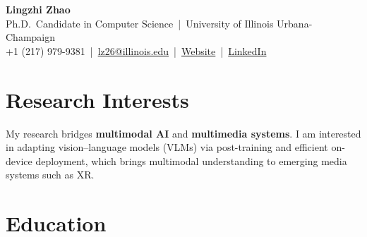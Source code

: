 \documentclass[10pt, letterpaper]{article}
\begin{document}

\begin{center}
  {\Huge\bfseries\color{navy} Lingzhi Zhao}\\[2pt]
  {\small\color{midgray}
    Ph.D.\ Candidate in Computer Science \,|\, University of Illinois Urbana-Champaign}\\[1pt]
  {\small
    +1 (217) 979-9381 \,|\,
    \href{mailto:lz26@illinois.edu}{lz26@illinois.edu} \,|\,
    \href{https://chutoutian.github.io}{Website} \,|\,
    \href{https://linkedin.com/in/lingzhizhao}{LinkedIn}
  }
\end{center}

\section{Research Interests}

My research bridges \textbf{multimodal AI} and \textbf{multimedia systems}. I am interested in adapting vision–language models (VLMs) via post-training and efficient on-device deployment, which brings multimodal understanding to emerging media systems such as XR.

\section{Education}
\end{document}

